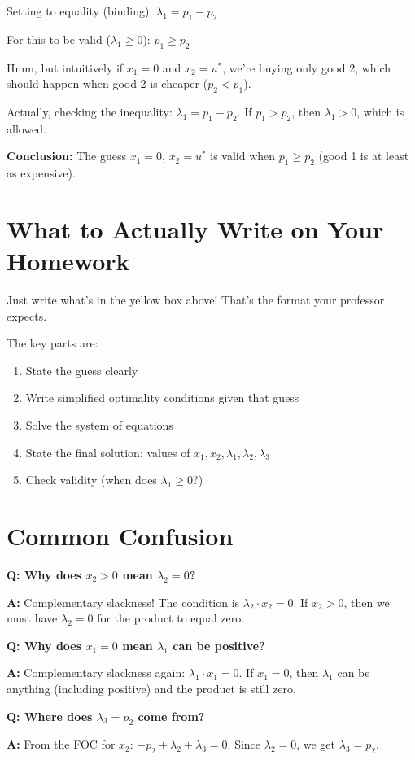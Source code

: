 \documentclass[11pt]{article}
\begin{document}
Setting to equality (binding): $\lambda_1 = p_1 - p_2$

For this to be valid ($\lambda_1 \geq 0$): $p_1 \geq p_2$

Hmm, but intuitively if $x_1 = 0$ and $x_2 = u^*$, we're buying only good 2, which should happen when good 2 is cheaper ($p_2 < p_1$).

Actually, checking the inequality: $\lambda_1 = p_1 - p_2$. If $p_1 > p_2$, then $\lambda_1 > 0$, which is allowed.

\textbf{Conclusion:} The guess $x_1 = 0$, $x_2 = u^*$ is valid when $p_1 \geq p_2$ (good 1 is at least as expensive).

\section{What to Actually Write on Your Homework}

Just write what's in the yellow box above! That's the format your professor expects.

The key parts are:
\begin{enumerate}
\item State the guess clearly
\item Write simplified optimality conditions given that guess
\item Solve the system of equations
\item State the final solution: values of $x_1, x_2, \lambda_1, \lambda_2, \lambda_3$
\item Check validity (when does $\lambda_1 \geq 0$?)
\end{enumerate}

\section{Common Confusion}

\textbf{Q: Why does $x_2 > 0$ mean $\lambda_2 = 0$?}

\textbf{A:} Complementary slackness! The condition is $\lambda_2 \cdot x_2 = 0$. If $x_2 > 0$, then we must have $\lambda_2 = 0$ for the product to equal zero.

\textbf{Q: Why does $x_1 = 0$ mean $\lambda_1$ can be positive?}

\textbf{A:} Complementary slackness again: $\lambda_1 \cdot x_1 = 0$. If $x_1 = 0$, then $\lambda_1$ can be anything (including positive) and the product is still zero.

\textbf{Q: Where does $\lambda_3 = p_2$ come from?}

\textbf{A:} From the FOC for $x_2$: $-p_2 + \lambda_2 + \lambda_3 = 0$. Since $\lambda_2 = 0$, we get $\lambda_3 = p_2$.
\end{document}
